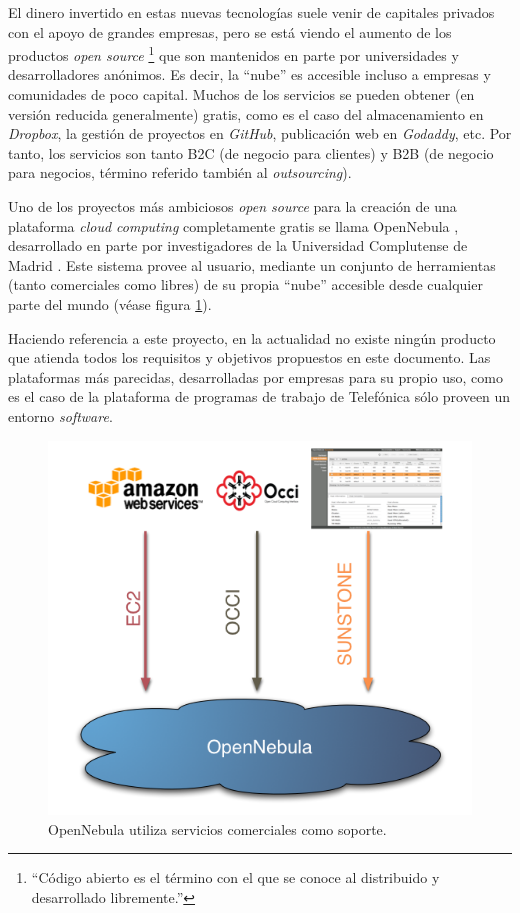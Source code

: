 El dinero invertido en estas nuevas tecnologías suele venir de 
capitales privados con el apoyo de grandes empresas, pero se está 
viendo el aumento de los productos \emph{open source} 
\footnote{``Código abierto es el término con el que se conoce al 
\software distribuido y desarrollado libremente.''\cite{LinuxKernel}} 
que son mantenidos en parte por universidades y 
desarrolladores anónimos. Es decir, la ``nube'' es accesible incluso a 
empresas y comunidades de poco capital. Muchos de los servicios se 
pueden obtener (en versión reducida generalmente) gratis, como es el 
caso del almacenamiento en \emph{Dropbox}, la gestión de proyectos en 
\emph{GitHub}, publicación web en \emph{Godaddy}, etc. Por tanto, los 
servicios son tanto B2C (de negocio para clientes) y B2B (de negocio 
para negocios, término referido también al \emph{outsourcing}).

Uno de los proyectos más ambiciosos \emph{open source} para la 
creación de una plataforma \emph{cloud computing} completamente gratis se 
llama OpenNebula , desarrollado en parte por investigadores de la 
Universidad Complutense de Madrid \cite{openNebula}. Este sistema 
provee al usuario, mediante un conjunto de herramientas (tanto 
comerciales como libres) de su propia ``nube'' accesible desde 
cualquier parte del mundo (véase figura \ref{fig:openNebula}).

Haciendo referencia a este proyecto, en la actualidad no existe ningún 
producto que atienda todos los requisitos y objetivos propuestos en 
este documento. Las plataformas más parecidas, desarrolladas por 
empresas para su propio uso, como es el caso de la plataforma de 
programas de trabajo de Telefónica sólo proveen un entorno 
\emph{software}.

\begin{figure}
	\centering
	\includegraphics[scale=0.6]{images/opennebula.png}
	\caption[OpenNebula]{OpenNebula utiliza servicios comerciales como soporte.}
	\label{fig:openNebula}
\end{figure}


